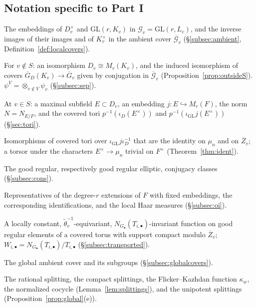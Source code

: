 \documentclass[12pt]{article}
\newcommand{\ov}[1]{\overline{#1}}
\newcommand{\A}{\mathbb{A}}
\newcommand{\Iso}{\operatorname{Iso}}
\newcommand{\GL}{\mathrm{GL}}
\newcommand{\Gb}{\ov{G}}
\newcommand{\Zb}{\ov{Z}}
\newcommand{\GDb}{\ov{G}_D}
\newcommand{\ks}{\kappa^{*}}
\newcommand{\Eb}{\ov{E}}
\newcommand{\cG}{\mathcal{G}}
\newcommand{\cGb}{\ov{\mathcal{G}}}
\newcommand{\iD}{\iota_D}
\newcommand{\iG}{\iota_{\GL}}
\newcommand{\jj}{\jmath}
\theoremstyle{plain}
\theoremstyle{definition}
\begin{document}
\subsection{Notation specific to Part I}\label{subsec:glossI}
\begin{description}[style=nextline,leftmargin=1.5em]
\item[$\iD$, $\iG$; $\GDb(K_v)$, $\Gb_v$, $\Zb_v$] The embeddings of $D_v^\times$ and $\GL(r,K_v)$ in $\cG_v=\GL(r,L_v)$, and the inverse images of their images and of $K_v^\times$ in the ambient cover $\cGb_v$ (\S\ref{subsec:ambient}, Definition~\ref{def:localcovers}).
\item[$\alpha_v$, $\psi_v$] For $v\notin S$: an isomorphism $D_v\cong M_r(K_v)$, and the induced isomorphism of covers $\GDb(K_v)\to\Gb_v$ given by conjugation in $\cGb_v$ (Proposition~\ref{prop:outsideS}). $\psi^V=\otimes_{v\notin V}\psi_v$ (\S\ref{subsec:sep}).
\item[$E$, $j$, $N$; $\Eb_D$, $\Eb_{\GL}$] At $v\in S$: a maximal subfield $E\subset D_v$, an embedding $j:E\hookrightarrow M_r(F)$, the norm $N=N_{E/F}$, and the covered tori $p^{-1}(\iD(E^\times))$ and $p^{-1}(\iG j(E^\times))$ (\S\ref{sec:tori}).
\item[$\Iso_{\Zb}(\Eb_D,\Eb_{\GL})$] Isomorphisms of covered tori over $\iG j\iD^{-1}$ that are the identity on $\mu_n$ and on $\Zb_v$; a torsor under the characters $E^\times\to\mu_n$ trivial on $F^\times$ (Theorem~\ref{thm:ident}).
\item[$\mathcal C^{g}(\GDb(K_v))$, $\mathcal C^{g}_{\mathrm{ell}}(\Gb_v)$] The good regular, respectively good regular elliptic, conjugacy classes (\S\ref{subsec:cons}).
\item[$E_i$, $j_i$, $\jj_i$; $dg_D$, $dg$, $dt_i$] Representatives of the degree-$r$ extensions of $F$ with fixed embeddings, the corresponding identifications, and the local Haar measures (\S\ref{subsec:oi}).
\item[Admissible function; $W_{i,\bullet}$] A locally constant, $\tilde\theta_v^{-1}$-equivariant, $N_{G_\bullet}(T_{i,\bullet})$-invariant function on good regular elements of a covered torus with support compact modulo $\Zb_v$; $W_{i,\bullet}=N_{G_\bullet}(T_{i,\bullet})/T_{i,\bullet}$ (\S\ref{subsec:transported}).
\item[$\cGb(\A_L)$, $\GDb(\A_K)$, $\Gb(\A_K)$, $\Zb(\A_K)$] The global ambient cover and its subgroups (\S\ref{subsec:globalcovers}).
\item[$\iota$, $\ks_v$, $\kappa_w$, $\tau_w$, $s_N$] The rational splitting, the compact splittings, the Flicker--Kazhdan function $\kappa_w$, the normalized cocycle (Lemma~\ref{lem:splittings}), and the unipotent splittings (Proposition~\ref{prop:global}(e)).

\end{description}
\end{document}
